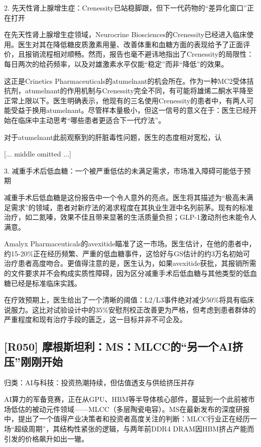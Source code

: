 \documentclass[11pt]{ctexart}
\begin{document}
2. 先天性肾上腺增生症：Crenessity已站稳脚跟，但下一代药物的“差异化窗口”正在打开

在先天性肾上腺增生症领域，Neurocrine Biosciences的Crenessity已经进入临床使用。医生对其在降低糖皮质激素用量、改善体重和血糖方面的表现给予了正面评价，且报销流程相对顺畅。然而，报告也毫不避讳地指出了Crenessity的局限性：每日两次的给药频率，以及对雄激素水平仅能“稳定”而非“降低”的效果。

这正是Crinetics Pharmaceuticals的atumelnant的机会所在。作为一种MC2受体拮抗剂，atumelnant的作用机制与Crenessity完全不同，有可能将雄烯二酮水平降至正常上限以下。医生明确表示，他现有的三名使用Crenessity的患者中，有两人可能受益于换用atumelnant。尽管样本量极小，但这一信号的意义在于：医生已经开始在临床中主动思考“哪些患者更适合下一代疗法”。

对于atumelnant此前观察到的肝脏毒性问题，医生的态度相对宽松，认

[... middle omitted ...]



3. 减重手术后低血糖：一个被严重低估的未满足需求，市场准入障碍可能低于预期

减重手术后低血糖是这份报告中一个令人意外的亮点。医生将其描述为“极高未满足需求”的领域，患者对新疗法的渴求程度在其执业生涯中名列前茅。现有的标准治疗，如二氮嗪，效果不佳且带来显著的生活质量负担；GLP-1激动剂也未能令人满意。

Amalyx Pharmaceuticals的avexitide瞄准了这一市场。医生估计，在他的患者中，约15-20\%正在经历频繁、严重的低血糖事件，这恰好与GS估计的约3万名初始可治疗患者高度吻合。更值得注意的是，医生认为，如果avexitide获批，其报销所需的文件要求并不会构成实质性障碍，因为区分减重手术后低血糖与其他类型的低血糖已经是标准临床实践。

在疗效预期上，医生给出了一个清晰的阈值：L2/L3事件绝对减少50\%将具有临床说服力。这比对试验设计中的35\%安慰剂校正改善更为严格，但考虑到患者群体的严重程度和现有治疗手段的匮乏，这一目标并非不可企及。

\subsection{[R050] 摩根斯坦利：MS：MLCC的“另一个AI挤压”刚刚开始}
{\small\color{refgray}归类：AI与科技：投资热潮持续，但估值透支与供给挤压并存}

AI算力的军备竞赛，正在从GPU、HBM等半导体核心部件，蔓延到一个此前被市场低估的被动元件领域——MLCC（多层陶瓷电容）。MS在最新发布的深度研报中，提出了一个值得产业决策者和投资者高度关注的判断：MLCC行业正在经历一场“超级周期”，其结构性紧张的逻辑，与两年前DDR4 DRAM因HBM挤占产能而引发的价格飙升如出一辙。
\end{document}

